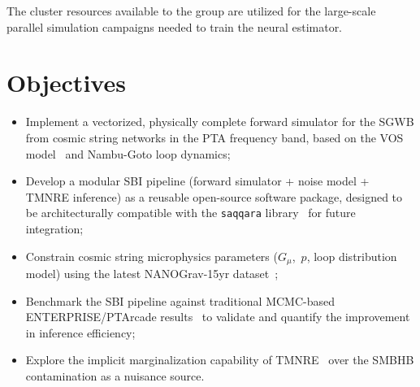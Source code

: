 The cluster resources available to the group are utilized for the large-scale parallel simulation campaigns needed to train the neural estimator.


\section{Objectives}\label{sec:1-objectives}
\begin{itemize}
    \item Implement a vectorized, physically complete forward simulator for the SGWB from cosmic string networks in the PTA frequency band, based on the VOS model~\cite{martins_quantitative_1996,martins_extending_2002} and Nambu-Goto loop dynamics;
    \item Develop a modular SBI pipeline (forward simulator + noise model + TMNRE inference) as a reusable open-source software package, designed to be architecturally compatible with the \texttt{saqqara} library~\cite{alvey_simulationbased_2024} for future integration;
    \item Constrain cosmic string microphysics parameters ($G_{\mu}$,~$p$, loop distribution model) using the latest NANOGrav-15yr dataset~\cite{afzal_nanograv_2023};
    \item Benchmark the SBI pipeline against traditional MCMC-based ENTERPRISE/PTArcade results~\cite{ellis_enterprise_2020,mitridate_ptarcade_2023} to validate and quantify the improvement in inference efficiency;
    \item Explore the implicit marginalization capability of TMNRE~\cite{miller_truncated_2021} over the SMBHB contamination as a nuisance source.
\end{itemize}

